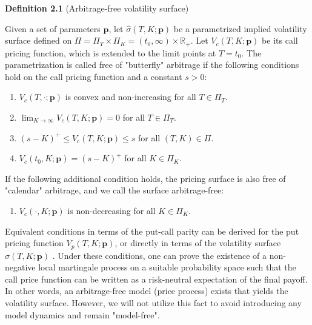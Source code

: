 \begin{center}
\textbf{Definition 2.1} (Arbitrage-free volatility surface)
\end{center}
Given a set of parameters $\mathbf{p}$, let $\hat{\sigma}(T, K; \mathbf{p})$ be a parametrized implied volatility surface defined on $\Pi = \Pi_T \times \Pi_K = (t_0, \infty) \times \mathbb{R}_+$. Let $V_c(T, K; \mathbf{p})$ be its call pricing function, which is extended to the limit points at $T = t_0$. The parametrization is called free of "butterfly" arbitrage if the following conditions hold on the call pricing function and a constant $s > 0$:
\begin{enumerate}[label=\roman*)]
    \item $V_c(T, \cdot; \mathbf{p})$ is convex and non-increasing for all $T \in \Pi_T$.
    \item $\lim_{K \to \infty} V_c(T, K; \mathbf{p}) = 0$ for all $T \in \Pi_T$.
    \item $(s - K)^+ \leq V_c(T, K; \mathbf{p}) \leq s$ for all $(T, K) \in \Pi$.
    \item $V_c(t_0, K; \mathbf{p}) = (s - K)^+$ for all $K \in \Pi_K$.
\end{enumerate}
If the following additional condition holds, the pricing surface is also free of "calendar" arbitrage, and we call the surface arbitrage-free:
\begin{enumerate}[label=\roman*), resume]
    \item $V_c(\cdot, K; \mathbf{p})$ is non-decreasing for all $K \in \Pi_K$.
\end{enumerate}
Equivalent conditions in terms of the put-call parity can be derived for the put pricing function $V_p(T, K; \mathbf{p})$, or directly in terms of the volatility surface $\hat{\sigma}(T, K; \mathbf{p})$ \cite{zaugg2024randomized}. Under these conditions, one can prove the existence of a non-negative local martingale process on a suitable probability space such that the call price function can be written as a risk-neutral expectation of the final payoff. In other words, an arbitrage-free model (price process) exists that yields the volatility surface. However, we will not utilize this fact to avoid introducing any model dynamics and remain "model-free".
